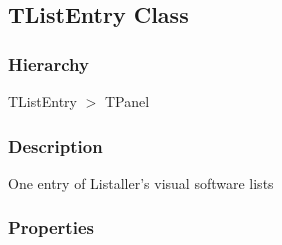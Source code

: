 \documentclass{report}
\begin{document}
\subsection*{TListEntry Class}
\fi
\label{lentries.TListEntry}
\subsubsection*{\large{\textbf{Hierarchy}}\normalsize\hspace{1ex}\hfill}
TListEntry {$>$} TPanel
\subsubsection*{\large{\textbf{Description}}\normalsize\hspace{1ex}\hfill}
One entry of Listaller's visual software lists\subsubsection*{\large{\textbf{Properties}}\normalsize\hspace{1ex}\hfill}
\end{document}
